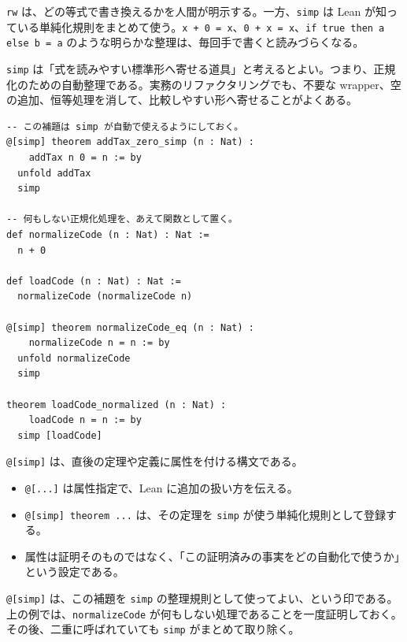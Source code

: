 \texttt{rw} は、どの等式で書き換えるかを人間が明示する。一方、\texttt{simp} は Lean が知っている単純化規則をまとめて使う。\texttt{x + 0 = x}、\texttt{0 + x = x}、\texttt{if true then a else b = a} のような明らかな整理は、毎回手で書くと読みづらくなる。

\begin{intuitionbox}
\texttt{simp} は「式を読みやすい標準形へ寄せる道具」と考えるとよい。つまり、正規化のための自動整理である。実務のリファクタリングでも、不要な wrapper、空の追加、恒等処理を消して、比較しやすい形へ寄せることがよくある。
\end{intuitionbox}

\begin{listing}[htbp]
\begin{verbatim}
-- この補題は simp が自動で使えるようにしておく。
@[simp] theorem addTax_zero_simp (n : Nat) :
    addTax n 0 = n := by
  unfold addTax
  simp

-- 何もしない正規化処理を、あえて関数として置く。
def normalizeCode (n : Nat) : Nat :=
  n + 0

def loadCode (n : Nat) : Nat :=
  normalizeCode (normalizeCode n)

@[simp] theorem normalizeCode_eq (n : Nat) :
    normalizeCode n = n := by
  unfold normalizeCode
  simp

theorem loadCode_normalized (n : Nat) :
    loadCode n = n := by
  simp [loadCode]
\end{verbatim}
\caption{\texttt{simp} で使う正規化規則を登録する}
\label{lst:ch12-simp}
\end{listing}

\begin{syntaxbox}
\texttt{@[simp]} は、直後の定理や定義に属性を付ける構文である。
\begin{itemize}
\item \texttt{@[...]} は属性指定で、Lean に追加の扱い方を伝える。
\item \texttt{@[simp] theorem ...} は、その定理を \texttt{simp} が使う単純化規則として登録する。
\item 属性は証明そのものではなく、「この証明済みの事実をどの自動化で使うか」という設定である。
\end{itemize}
\end{syntaxbox}

\texttt{@[simp]} は、この補題を \texttt{simp} の整理規則として使ってよい、という印である。上の例では、\texttt{normalizeCode} が何もしない処理であることを一度証明しておく。その後、二重に呼ばれていても \texttt{simp} がまとめて取り除く。

